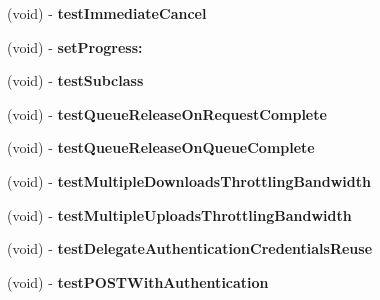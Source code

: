 \begin{DoxyCompactItemize}
\item 
\hypertarget{interface_a_s_i_network_queue_tests_a5621d435f7e0be616841da617af3ae7b}{
(void) -\/ {\bfseries test\-Immediate\-Cancel}}
\label{interface_a_s_i_network_queue_tests_a5621d435f7e0be616841da617af3ae7b}

\item 
\hypertarget{interface_a_s_i_network_queue_tests_aaa3ee5989847c5200d079241b5527795}{
(void) -\/ {\bfseries set\-Progress\-:}}
\label{interface_a_s_i_network_queue_tests_aaa3ee5989847c5200d079241b5527795}

\item 
\hypertarget{interface_a_s_i_network_queue_tests_a6c75d4f9034d8f96da30002fa7c39f6a}{
(void) -\/ {\bfseries test\-Subclass}}
\label{interface_a_s_i_network_queue_tests_a6c75d4f9034d8f96da30002fa7c39f6a}

\item 
\hypertarget{interface_a_s_i_network_queue_tests_a6ebc6405b8f6639be717def3dcbcd617}{
(void) -\/ {\bfseries test\-Queue\-Release\-On\-Request\-Complete}}
\label{interface_a_s_i_network_queue_tests_a6ebc6405b8f6639be717def3dcbcd617}

\item 
\hypertarget{interface_a_s_i_network_queue_tests_a8367da7729b914e691602cbfbb0cd4d6}{
(void) -\/ {\bfseries test\-Queue\-Release\-On\-Queue\-Complete}}
\label{interface_a_s_i_network_queue_tests_a8367da7729b914e691602cbfbb0cd4d6}

\item 
\hypertarget{interface_a_s_i_network_queue_tests_afecabb41732addf7e0b63960536af284}{
(void) -\/ {\bfseries test\-Multiple\-Downloads\-Throttling\-Bandwidth}}
\label{interface_a_s_i_network_queue_tests_afecabb41732addf7e0b63960536af284}

\item 
\hypertarget{interface_a_s_i_network_queue_tests_a3c936cbdc4d5d95c086acccc6b61a277}{
(void) -\/ {\bfseries test\-Multiple\-Uploads\-Throttling\-Bandwidth}}
\label{interface_a_s_i_network_queue_tests_a3c936cbdc4d5d95c086acccc6b61a277}

\item 
\hypertarget{interface_a_s_i_network_queue_tests_ad451f41961e411ca4e0a493564f3782e}{
(void) -\/ {\bfseries test\-Delegate\-Authentication\-Credentials\-Reuse}}
\label{interface_a_s_i_network_queue_tests_ad451f41961e411ca4e0a493564f3782e}

\item 
\hypertarget{interface_a_s_i_network_queue_tests_aa73ecf9606cf1826f4137aef4ff343be}{
(void) -\/ {\bfseries test\-P\-O\-S\-T\-With\-Authentication}}
\label{interface_a_s_i_network_queue_tests_aa73ecf9606cf1826f4137aef4ff343be}


\end{DoxyCompactItemize}

